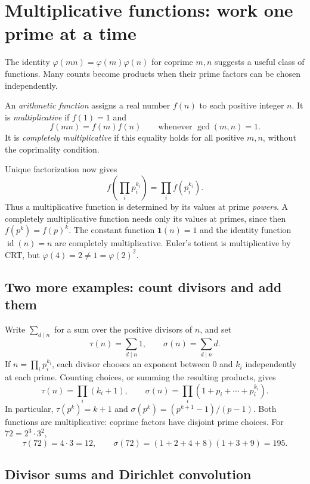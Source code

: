 \section{Multiplicative functions: work one prime at a time}
\label{sec:multiplicative-functions}

The identity $\varphi(mn)=\varphi(m)\varphi(n)$ for coprime $m,n$
suggests a useful class of functions. Many counts become products when
their prime factors can be chosen independently.

\begin{definition}
An \emph{arithmetic function} assigns a real number $f(n)$ to each
positive integer $n$. It is \emph{multiplicative} if $f(1)=1$ and
\[
 f(mn)=f(m)f(n)\qquad\text{whenever }\gcd(m,n)=1.
\]
It is \emph{completely multiplicative} if this equality holds for all
positive $m,n$, without the coprimality condition.
\end{definition}

Unique factorization now gives
\[
 f\left(\prod_i p_i^{k_i}\right)=\prod_i f(p_i^{k_i}).
\]
Thus a multiplicative function is determined by its values at prime
\emph{powers}. A completely multiplicative function needs only its
values at primes, since then $f(p^k)=f(p)^k$.
The constant function $\mathbf{1}(n)=1$ and the identity function
$\operatorname{id}(n)=n$ are completely multiplicative.
Euler's totient is multiplicative by CRT, but
$\varphi(4)=2\ne1=\varphi(2)^2$.

\subsection*{Two more examples: count divisors and add them}

Write $\sum_{d\mid n}$ for a sum over the positive divisors of $n$, and set
\[
 \tau(n)=\sum_{d\mid n}1,\qquad \sigma(n)=\sum_{d\mid n}d.
\]
If $n=\prod_i p_i^{k_i}$, each divisor chooses an exponent between
$0$ and $k_i$ independently at each prime. Counting choices, or summing
the resulting products, gives
\[
 \tau(n)=\prod_i(k_i+1),\qquad
 \sigma(n)=\prod_i(1+p_i+\cdots+p_i^{k_i}).
\]
In particular, $\tau(p^k)=k+1$ and
$\sigma(p^k)=(p^{k+1}-1)/(p-1)$. Both functions are multiplicative:
coprime factors have disjoint prime choices. For $72=2^3\cdot3^2$,
\[
 \tau(72)=4\cdot3=12,\qquad
 \sigma(72)=(1+2+4+8)(1+3+9)=195.
\]

\subsection*{Divisor sums and Dirichlet convolution}

